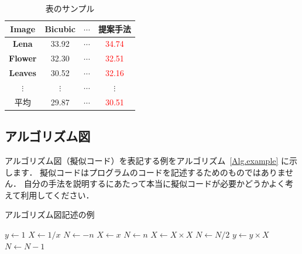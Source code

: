\documentclass[dvipdfmx,report,disablejfam,nosetpagesize,12pt]{jsbook}
\begin{document}
\begin{table}[t]
   \centering
   \caption{表のサンプル}\label{Tbl.example}
   \small
   \begin{tabular}{c|ccc}
      \hline
      \textbf{Image}  & Bicubic  & $\cdots$ & 提案手法 \\
      \hline
      \textbf{Lena}   & 33.92    & $\cdots$ & \textcolor{red}{34.74} \\
      \textbf{Flower} & 32.30    & $\cdots$ & \textcolor{red}{32.51} \\
      \textbf{Leaves} & 30.52    & $\cdots$ & \textcolor{red}{32.16} \\
      $\vdots$        & $\vdots$ & $\cdots$ &    $\vdots$        \\\hline
      平均            & 29.87    & $\cdots$ & \textcolor{red}{30.51} \\\hline
   \end{tabular}
\end{table}

\subsection{アルゴリズム図}
アルゴリズム図（擬似コード）を表記する例をアルゴリズム~\ref{Alg.example} に示します．
擬似コードはプログラムのコードを記述するためのものではありません．
自分の手法を説明するにあたって本当に擬似コードが必要かどうかよく考えて利用してください．

\begin{algorithm}[t]
   \caption{アルゴリズム図記述の例}
   \label{Alg.example}
   \begin{algorithmic}[1]
      \STATE $y \leftarrow 1$
         \STATE $X \leftarrow 1 / x$
         \STATE $N \leftarrow -n$
      \ELSE
         \STATE $X \leftarrow x$
         \STATE $N \leftarrow n$
      \ENDIF
            \STATE $X \leftarrow X \times X$
            \STATE $N \leftarrow N / 2$
         \ELSE[$N$ is odd]
            \STATE $y \leftarrow y \times X$
            \STATE $N \leftarrow N - 1$
         \ENDIF
      \ENDWHILE
   \end{algorithmic}
\end{algorithm}
\end{document}
